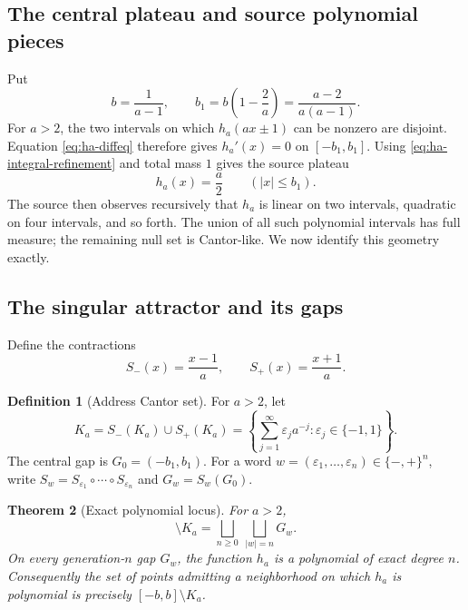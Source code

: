 \documentclass[11pt,oneside]{article}
\newtheorem{theorem}{Theorem}[section]
\theoremstyle{definition}
\newtheorem{definition}[theorem]{Definition}
\theoremstyle{remark}
\newcommand{\eps}{\varepsilon}
\begin{document}
\subsection{The central plateau and source polynomial pieces}

Put
\begin{equation}
 b=\frac1{a-1},\qquad
 b_1=b\left(1-\frac2a\right)=\frac{a-2}{a(a-1)}.
 \label{eq:b-b1}
\end{equation}
For $a>2$, the two intervals on which $h_a(ax\pm1)$ can be nonzero are disjoint.
Equation \eqref{eq:ha-diffeq} therefore gives $h_a'(x)=0$ on $[-b_1,b_1]$.
Using \eqref{eq:ha-integral-refinement} and total mass $1$ gives the source plateau
\begin{equation}
 h_a(x)=\frac a2\qquad(|x|\le b_1).
 \tag{S3.40}
 \label{eq:central-plateau}
\end{equation}
The source then observes recursively that $h_a$ is linear on two intervals, quadratic on
four intervals, and so forth.  The union of all such polynomial intervals has full measure;
the remaining null set is Cantor-like.  We now identify this geometry exactly.

\subsection{The singular attractor and its gaps}

Define the contractions
\begin{equation}
 S_-(x)=\frac{x-1}{a},\qquad S_+(x)=\frac{x+1}{a}.
 \label{eq:IFS-maps}
\end{equation}

\begin{definition}[Address Cantor set]
\label{def:Ka}
For $a>2$, let
\begin{equation}
 K_a=S_-(K_a)\cup S_+(K_a)
 =\left\{\sum_{j=1}^{\infty}\eps_j a^{-j}:\eps_j\in\{-1,1\}\right\}.
 \label{eq:Ka}
\end{equation}
The central gap is $G_0=(-b_1,b_1)$.  For a word
$w=(\eps_1,\ldots,\eps_n)\in\{-,+\}^n$, write
$S_w=S_{\eps_1}\circ\cdots\circ S_{\eps_n}$ and
$G_w=S_w(G_0)$.
\end{definition}

\begin{theorem}[Exact polynomial locus]
\label{thm:polynomial-locus}
For $a>2$,
\begin{equation}
 [-b,b]\setminus K_a=\bigsqcup_{n\ge0}\ \bigsqcup_{|w|=n}G_w.
 \label{eq:gap-decomposition}
\end{equation}
On every generation-$n$ gap $G_w$, the function $h_a$ is a polynomial of exact degree $n$.
Consequently the set of points admitting a neighborhood on which $h_a$ is polynomial is
precisely $[-b,b]\setminus K_a$.
\end{theorem}
\end{document}
